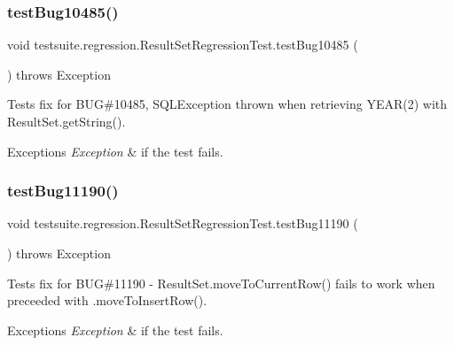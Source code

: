 \subsubsection{\texorpdfstring{test\+Bug10485()}{testBug10485()}}
{\footnotesize\ttfamily void testsuite.\+regression.\+Result\+Set\+Regression\+Test.\+test\+Bug10485 (\begin{DoxyParamCaption}{ }\end{DoxyParamCaption}) throws Exception}

Tests fix for B\+UG\#10485, S\+Q\+L\+Exception thrown when retrieving Y\+E\+A\+R(2) with Result\+Set.\+get\+String().


\begin{DoxyExceptions}{Exceptions}
{\em Exception} & if the test fails. \\
\hline
\end{DoxyExceptions}
\mbox{\label{classtestsuite_1_1regression_1_1_result_set_regression_test_aeb922ab7f293e6e7184ea654eb06a00a}} 
\subsubsection{\texorpdfstring{test\+Bug11190()}{testBug11190()}}
{\footnotesize\ttfamily void testsuite.\+regression.\+Result\+Set\+Regression\+Test.\+test\+Bug11190 (\begin{DoxyParamCaption}{ }\end{DoxyParamCaption}) throws Exception}

Tests fix for B\+UG\#11190 -\/ Result\+Set.\+move\+To\+Current\+Row() fails to work when preceeded with .move\+To\+Insert\+Row().


\begin{DoxyExceptions}{Exceptions}
{\em Exception} & if the test fails. \\
\hline
\end{DoxyExceptions}
\mbox{\label{classtestsuite_1_1regression_1_1_result_set_regression_test_a51f2936ac4b4712e95e6a70490704482}} 
